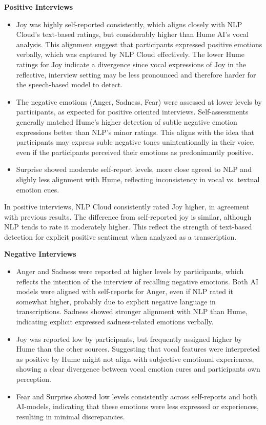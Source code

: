 \textbf{Positive Interviews}
\begin{itemize}
    \item Joy was highly self-reported consistently, which aligns closely with NLP Cloud's text-based ratings, but considerably higher than Hume AI's vocal analysis. 
    This alignment suggest that participants expressed positive emotions verbally, which was captured by NLP Cloud effectively. The lower Hume ratings for Joy indicate a divergence since vocal expressions of Joy in 
    the reflective, interview setting may be less pronounced and therefore harder for the speech-based model to detect. 
    \item The negative emotions (Anger, Sadness, Fear) were assessed at lower levels by participants, as expected for positive oriented interviews. Self-assessments generally matched Hume's higher detection of subtle negative emotion expressions better than NLP's minor ratings. 
    This aligns with the idea that participants may express suble negative tones unintentionally in their voice, even if the participants perceived their emotions as predonimantly positive. 
    \item Surprise showed moderate self-report levels, more close agreed to NLP and slighly less alignment with Hume, reflecting inconsistency in vocal vs. textual emotion cues.  
\end{itemize}
In positive interviews, NLP Cloud consistently rated Joy higher, in agreement with previous results. The difference from self-reported joy is similar, although NLP tends to rate it moderately higher. 
This reflect the strength of text-based detection for explicit positive sentiment when analyzed as a transcription. 

\medskip
\textbf{Negative Interviews}
\begin{itemize}
    \item Anger and Sadness were reported at higher levels by participants, which reflects the intention of the interview of recalling negative emotions. Both AI models were aligned with self-reports for Anger, even if NLP rated it somewhat higher, 
    probably due to explicit negative language in transcriptions. Sadness showed stronger alignment with NLP than Hume, indicating explicit expressed sadness-related emotions verbally. 
    \item Joy was reported low by participants, but frequently assigned higher by Hume than the other sources. Suggesting that vocal features were interpreted as positive by Hume might not align with subjective emotional experiences, 
    showing a clear divergence between vocal emotion cures and participants own perception. 
    \item Fear and Surprise showed low levels consistently across self-reports and both AI-models, indicating that these emotions were less expressed or experiences, resulting in minimal discrepancies. 
\end{itemize}

